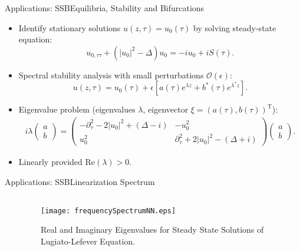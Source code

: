 \begin{frame}[c]{Applications: SSB}{Equilibria, Stability and Bifurcations }
\small{\begin{itemize}
\item Identify stationary solutions $u(z,\tau) = u_0 (\tau)$ by solving steady-state equation:
\[ u_{0,\tau\tau} + \left( |u_0|^2 - \Delta \right) u_0 = -i u_0 + i S(\tau). \] 
\item Spectral stability analysis with small perturbations $\mathcal{O} (\epsilon)$:
\[ u(z,\tau) = u_0(\tau) + \epsilon \left[ a(\tau) e^{\lambda z} + b^*(\tau) e^{\lambda^* z} \right]. \]
\item Eigenvalue problem (eigenvalues $\lambda$, eigenvector $\xi = (a(\tau), b(\tau))^{\mathrm{T}}$): 
\small{\begin{align*}
i \lambda \begin{pmatrix}  a \\ b \end{pmatrix} = \begin{pmatrix} -\partial_{\tau}^2 - 2|u_0|^2 + (\Delta - i) & -u_0^2 \\ u_0^2 & \partial_{\tau}^2 + 2|u_0|^2 - (\Delta + i) \end{pmatrix}  \begin{pmatrix} a\\ b\end{pmatrix}.
\end{align*}}
\item \textcolor{paleblue}{Linearly}  \textcolor{paleblue}{provided $\mathrm{Re}(\lambda)>0$}.
\end{itemize}}
\end{frame}


\begin{frame}[c]{Applications: SSB}{Linearization Spectrum}
\begin{columns}
\begin{column}{0.5\textwidth}
\centering
\end{column}
\begin{column}{0.5\textwidth}
\begin{figure}[h]
\centering
\texttt{[image: frequencySpectrumNN.eps]}
\caption{Real and Imaginary Eigenvalues for Steady State Solutions of Lugiato-Lefever Equation.}
\end{figure}
\end{column}
\end{columns}
\end{frame}

